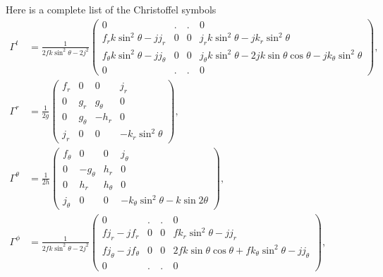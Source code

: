 \documentclass[english, parskip=full]{scrartcl}
\begin{document}
Here is a complete list of the Christoffel symbols
\begin{align}
\Gamma^t &= \frac{1}{2fk\sin^2\theta - 2j^2} \begin{pmatrix}
0 & . & . & 0 \\
f_rk\sin^2\theta - jj_r & 0 & 0 & j_r k\sin^2\theta - jk_r\sin^2\theta \\
f_\theta k\sin^2\theta - jj_\theta & 0 & 0 & j_\theta k\sin^2\theta - 2jk\sin\theta\cos\theta - jk_\theta\sin^2\theta \\
0 & .& . & 0
\end{pmatrix},\\
\Gamma^r &= \frac{1}{2g} \begin{pmatrix}
f_r & 0 & 0 & j_r \\
0 & g_r & g_\theta & 0 \\
0 & g_\theta & -h_r & 0 \\
j_r & 0 & 0 & -k_r\sin^2\theta
\end{pmatrix},\\
\Gamma^\theta &= \frac{1}{2h} \begin{pmatrix}
f_\theta & 0 & 0 & j_\theta \\
0 & -g_\theta & h_r & 0 \\
0 & h_r & h_\theta & 0 \\
j_\theta & 0 & 0 & -k_\theta \sin^2\theta - k\sin 2\theta
\end{pmatrix},\\
\Gamma^\phi &= \frac{1}{2fk\sin^2\theta - 2j^2} \begin{pmatrix}
0 & . & . & 0 \\
fj_r - jf_r & 0 & 0 & fk_r\sin^2\theta - jj_r \\
fj_\theta - jf_\theta & 0 & 0 & 2fk\sin\theta\cos\theta + fk_\theta \sin^2\theta - jj_\theta \\
0 & .& . & 0
\end{pmatrix},
\end{align}
%
\end{document}
